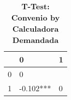 \begin{table}[H]\centering \caption{\textbf{T-Test: Convenio by Calculadora Demandada}}
\begin{tabular}{l*{2}{l}}
\toprule
                     & 0            & 1\\\midrule
0             &      0                   \\
1             & -0.102***    &      0    \\
\bottomrule\end{tabular}
\end{table}
